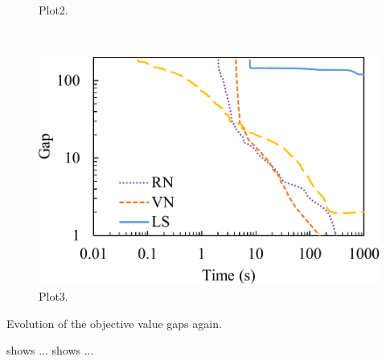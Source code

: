 \documentclass{article}
\begin{document}
\begin{szxfig*}[!tb]
\begin{subfigure}[b]{0.31\textwidth}
		\caption{Plot2.}
		\label{fig:convergence2}
	\end{subfigure}
	~
	\begin{subfigure}[b]{0.31\textwidth}
		\includegraphics[width=\textwidth]{fig-SampleFigure.pdf}
		\caption{Plot3.}
		\label{fig:convergence3}
	\end{subfigure}
	\caption{Evolution of the objective value gaps again.}
	\label{fig:textwidth}
\end{szxfig*}


 shows ...
 shows ...
\end{document}
